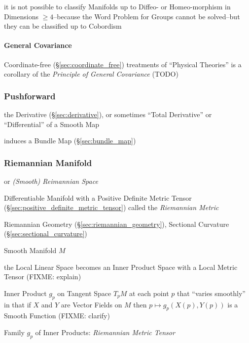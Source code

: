it is not possible to classify Manifolds up to Diffeo- or Homeo-morphism in
Dimensions $\geq 4$--because the Word Problem for Groups cannot be solved--but
they can be classified up to Cobordism




\paragraph{General Covariance}\label{sec:general_covariance}\hfill

Coordinate-free (\S\ref{sec:coordinate_free}) treatments of ``Physical
Theories'' is a corollary of the \emph{Principle of General Covariance} (TODO)



\subsubsection{Pushforward}\label{sec:pushforward}

the Derivative (\S\ref{sec:derivative}), or sometimes ``Total Derivative'' or
``Differential'' of a Smooth Map

induces a Bundle Map (\S\ref{sec:bundle_map})



\subsubsection{Riemannian Manifold}\label{sec:riemannian_manifold}


or \emph{(Smooth) Reimannian Space}

Differentiable Manifold with a Positive Definite Metric Tensor
(\S\ref{sec:positive_definite_metric_tensor}) called the
\emph{Riemannian Metric}

Riemannian Geometry (\S\ref{sec:riemannian_geometry}), Sectional Curvature
(\S\ref{sec:sectional_curvature})

Smooth Manifold $M$

the Local Linear Space becomes an Inner Product Space with a Local Metric Tensor
(FIXME: explain)

Inner Product $g_p$ on Tangent Space $T_pM$ at each point $p$ that
``varies smoothly'' in that if $X$ and $Y$ are Vector Fields on
$M$ then $p \mapsto g_p(X(p),Y(p))$ is a Smooth Function
(FIXME: clarify)

Family $g_p$ of Inner Products: \emph{Riemannian Metric Tensor}

